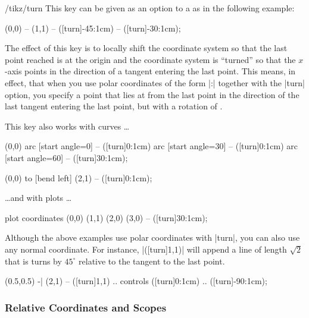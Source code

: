\begin{key}{/tikz/turn}
    This key can be given as an option to a  as in the
    following example:
\begin{codeexample}[]
\tikz \draw (0,0) -- (1,1) -- ([turn]-45:1cm) -- ([turn]-30:1cm);
\end{codeexample}
    The effect of this key is to locally shift the coordinate system so that
    the last point reached is at the origin and the coordinate system is
    ``turned'' so that the $x$-axis points in the direction of a tangent
    entering the last point. This means, in effect, that when you use polar
    coordinates of the form |:| together
    with the |turn| option, you specify a point that lies at 
    from the last point in the direction of the last tangent entering the last
    point, but with a rotation of .

    This key also works with curves \dots
\begin{codeexample}[]
\tikz [delta angle=30, radius=1cm]
  \draw (0,0) arc [start angle=0]  -- ([turn]0:1cm)
              arc [start angle=30] -- ([turn]0:1cm)
              arc [start angle=60] -- ([turn]30:1cm);
\end{codeexample}
\begin{codeexample}[]
\tikz \draw (0,0) to [bend left] (2,1) -- ([turn]0:1cm);
\end{codeexample}
    \dots and with plots \dots
\begin{codeexample}[]
\tikz \draw plot coordinates {(0,0) (1,1) (2,0) (3,0) } -- ([turn]30:1cm);
\end{codeexample}

    Although the above examples use polar coordinates with |turn|, you can also
    use any normal coordinate. For instance, |([turn]1,1)| will append a line
    of length $\sqrt 2$ that is turns by $45^\circ$ relative to the tangent to
    the last point.
\begin{codeexample}[]
\tikz \draw (0.5,0.5) -| (2,1) -- ([turn]1,1)
         .. controls ([turn]0:1cm) .. ([turn]-90:1cm);
\end{codeexample}
\end{key}


\subsubsection{Relative Coordinates and Scopes}
\label{section-scopes-relative}

